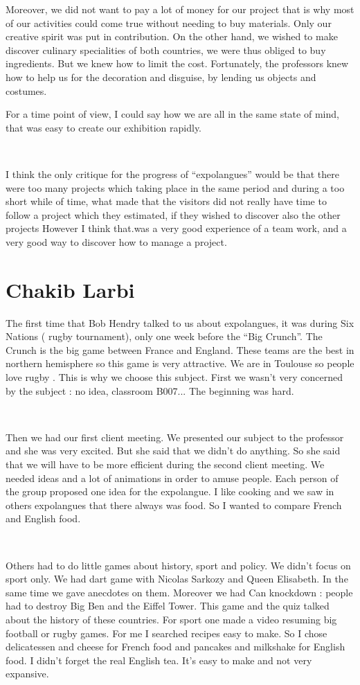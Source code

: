 \documentclass[11pt;a4paper]{report}
\begin{document}
Moreover, we did not want to pay a lot of money for our project that is why most of our activities could come true without needing to buy materials. Only our creative spirit was put in contribution. On the other hand, we wished to make discover culinary specialities of both countries, we were thus obliged to buy ingredients. But we knew how to limit the cost. Fortunately, the professors knew how to help us for the decoration and disguise, by lending us objects and costumes.

For a time point of view, I could say how we are all in the same state of mind, that was easy to create our exhibition rapidly.   

~

  I think the only critique for the progress of “expolangues” would be that there were too many projects which taking place in the same period and during a too short while of time, what made that the visitors did not really have time to follow a project which they estimated, if they wished to discover also the other projects
However I think that.was a very good experience of a team work, and a very good way to discover how to manage a project. 

\newpage
  \section{Chakib Larbi}

    The first time that Bob Hendry talked to us about expolangues, it was during Six Nations ( rugby tournament), only one week before the “Big Crunch”. The Crunch is the big game between France and England. These teams are the best in northern hemisphere so this game is very attractive. We are in Toulouse so people love rugby    . This is why we choose this subject. First we wasn't very concerned by the  subject : no idea, classroom B007... The beginning was hard. 

~

    Then we had our first client meeting. We presented our subject to the professor and she was very excited. But she said that we didn't do anything. So she said that we will have to be more efficient during the second client meeting.  We needed ideas and a lot of animations in order to amuse people. Each person of the group proposed one idea for the expolangue. I like cooking and we saw in others expolangues that there always was food. So I wanted to compare French and English food. 

~

    Others had to do little games about history, sport and policy. We didn’t focus on sport only. We had dart game with Nicolas Sarkozy and Queen Elisabeth. In the same time we gave anecdotes on them. Moreover we had Can knockdown : people had to destroy Big Ben and the Eiffel Tower. This game and the quiz talked about the history of these countries.  For sport one made a video resuming big football or rugby games. For me I searched recipes easy to make. So I chose delicatessen and cheese for French food and pancakes and milkshake for English food. I didn't forget the real English tea. It's easy to make and not very expansive. 
\end{document}
